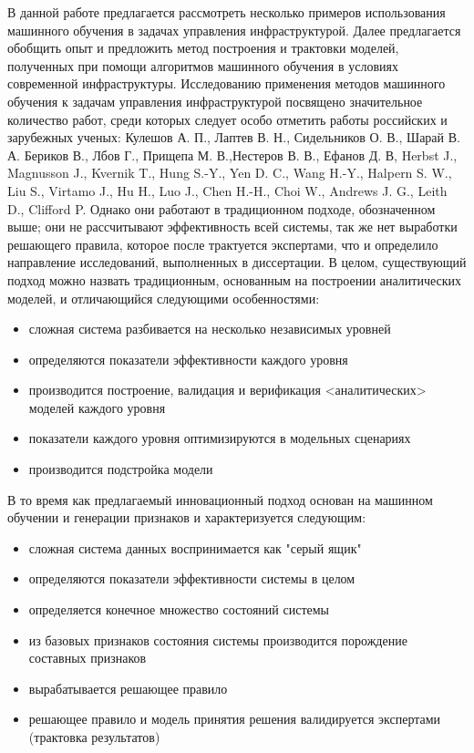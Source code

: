 
{\actuality} 
В данной работе предлагается рассмотреть несколько примеров использования машинного обучения в задачах управления инфраструктурой. Далее предлагается обобщить опыт и предложить метод построения и трактовки моделей, полученных при помощи алгоритмов машинного обучения в условиях современной инфраструктуры.
Исследованию применения методов машинного обучения к задачам управления инфраструктурой посвящено значительное количество работ, среди которых следует особо отметить работы российских и зарубежных ученых: Кулешов А. П., Лаптев В. Н., Сидельников О. В., Шарай В. А. Бериков В., Лбов Г., Прищепа М. В.,Нестеров В. В., Ефанов Д. В, Herbst J., Magnusson J., Kvernik T., Hung S.-Y., Yen D. C., Wang H.-Y., Halpern S. W., Liu S., Virtamo J., Hu H., Luo J., Chen H.-H., Choi W., Andrews J. G., Leith D., Clifford P. Однако они работают в традиционном подходе, обозначенном выше; они не рассчитывают эффективность всей системы, так же нет выработки решающего правила, которое после трактуется экспертами, что и определило направление исследований, выполненных в диссертации.
В целом, существующий подход можно назвать традиционным, основанным на построении аналитических моделей, и отличающийся следующими особенностями:
\begin{itemize}
\item  сложная система разбивается на несколько независимых уровней
\item  определяются показатели эффективности каждого уровня
\item  производится построение, валидация и верификация <аналитических> моделей каждого уровня
\item  показатели каждого уровня оптимизируются в модельных сценариях
\item  производится подстройка модели
\end{itemize}
В то время как предлагаемый инновационный подход основан на машинном обучении и генерации признаков и характеризуется следующим:
\begin{itemize}
\item  сложная система данных воспринимается как "серый ящик"
\item  определяются показатели эффективности системы в целом
\item  определяется конечное множество состояний системы
\item  из базовых признаков состояния системы производится порождение составных признаков
\item  вырабатывается решающее правило
\item  решающее правило и модель принятия решения валидируется экспертами (трактовка результатов)
\end{itemize}
